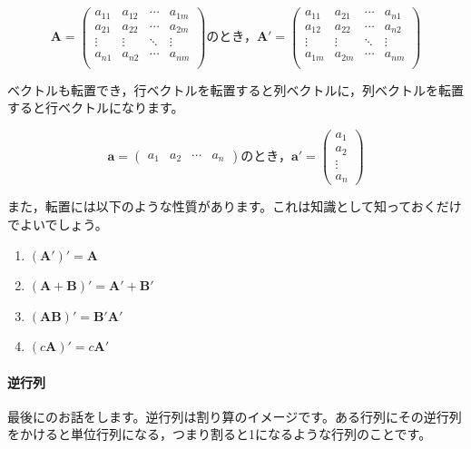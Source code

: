 \documentclass{ltjsbook}
\begin{document}
\begin{equation*}
    \bm{A}=
    \begin{pmatrix}
        a_{11} & a_{12} & \cdots & a_{1m} \\
        a_{21} & a_{22} & \cdots & a_{2m} \\
        \vdots & \vdots & \ddots & \vdots \\
        a_{n1} & a_{n2} & \cdots & a_{nm} \\
    \end{pmatrix}
    \mbox{のとき，}
    \bm{A}'=
    \begin{pmatrix}
        a_{11} & a_{21} & \cdots & a_{n1} \\
        a_{12} & a_{22} & \cdots & a_{n2} \\
        \vdots & \vdots & \ddots & \vdots \\
        a_{1m} & a_{2m} & \cdots & a_{nm} \\
    \end{pmatrix}
\end{equation*}


ベクトルも転置でき，行ベクトルを転置すると列ベクトルに，列ベクトルを転置すると行ベクトルになります。

\begin{equation*}
    \bm{a} =
    \begin{pmatrix}
        a_1 & a_2 & \cdots & a_n
    \end{pmatrix}
    \mbox{のとき，}
    \bm{a}'=
    \begin{pmatrix}
        a_1    \\
        a_2    \\
        \vdots \\
        a_n
    \end{pmatrix}
\end{equation*}

また，転置には以下のような性質があります。これは知識として知っておくだけでよいでしょう。
\begin{enumerate}
    \item $(\bm{A} ')' = \bm{A}$
    \item $(\bm{A} + \bm{B} )' = \bm{A}' + \bm{B}'$
    \item $(\bm{A} \bm{B})'=\bm{B}'\bm{A}'$
    \item $(c\bm{A})'=c\bm{A}'$
\end{enumerate}

\paragraph{逆行列}
最後にのお話をします。逆行列は割り算のイメージです。ある行列にその逆行列をかけると単位行列になる，つまり割ると1になるような行列のことです。
\end{document}
